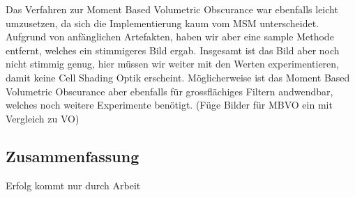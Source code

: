 \documentclass[runningheaders,a4paper]{llncs}
\begin{document}
Das Verfahren zur Moment Based Volumetric Obscurance war ebenfalls leicht umzusetzen, da sich die Implementierung kaum vom MSM unterscheidet. Aufgrund von anfänglichen Artefakten, haben wir aber eine sample Methode entfernt, welches ein stimmigeres Bild ergab. Insgesamt ist das Bild aber noch nicht stimmig genug, hier müssen wir weiter mit den Werten experimentieren, damit keine Cell Shading Optik erscheint. Möglicherweise ist das Moment Based Volumetric Obscurance aber ebenfalls für grossflächiges Filtern andwendbar, welches noch weitere Experimente benötigt.
(Füge Bilder für MBVO ein mit Vergleich zu VO)

\subsection{Zusammenfassung}
Erfolg kommt nur durch Arbeit\cite{blum}



\end{document}
